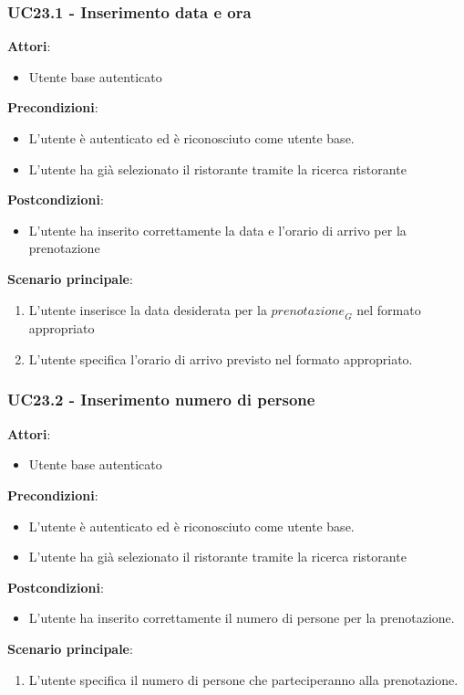 \subsubsection{UC23.1 - Inserimento data e ora}\label{usecase:23_1}
\textbf{Attori}:
\begin{itemize}
    \item Utente base autenticato
\end{itemize}
\textbf{Precondizioni}:
\begin{itemize}
    \item L'utente è autenticato ed è riconosciuto come utente base.
    \item L'utente ha già selezionato il ristorante tramite la ricerca ristorante 
\end{itemize}
\textbf{Postcondizioni}:
\begin{itemize}
    \item L'utente ha inserito correttamente la data e l'orario di arrivo per la prenotazione
\end{itemize}
\textbf{Scenario principale}:
\begin{enumerate}
    \item L'utente inserisce la data desiderata per la $\textit{prenotazione}_G$ nel formato appropriato
    \item L'utente specifica l'orario di arrivo previsto nel formato appropriato.
\end{enumerate}



\subsubsection{UC23.2 - Inserimento numero di persone}\label{usecase:23_2}
\textbf{Attori}:
\begin{itemize}
    \item Utente base autenticato
\end{itemize}
\textbf{Precondizioni}:
\begin{itemize}
    \item L'utente è autenticato ed è riconosciuto come utente base.
    \item L'utente ha già selezionato il ristorante tramite la ricerca ristorante 
\end{itemize}
\textbf{Postcondizioni}:
\begin{itemize}
    \item L'utente ha inserito correttamente il numero di persone per la prenotazione.
\end{itemize}
\textbf{Scenario principale}:
\begin{enumerate}
    \item L'utente specifica il numero di persone che parteciperanno alla prenotazione.
\end{enumerate}


